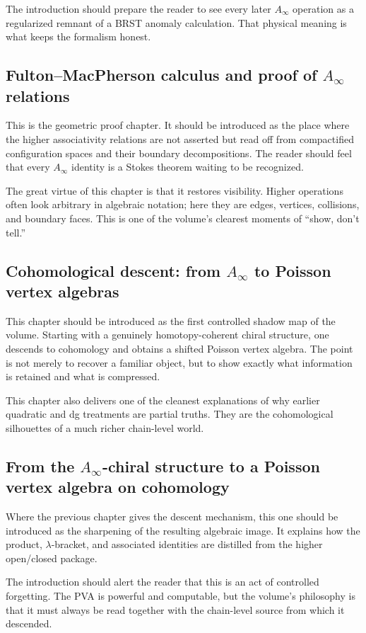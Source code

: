 The introduction should prepare the reader to see every later $A_\infty$ operation as a regularized remnant of a BRST anomaly calculation.  That physical meaning is what keeps the formalism honest.

\subsection*{Fulton--MacPherson calculus and proof of $A_\infty$ relations}
This is the geometric proof chapter.  It should be introduced as the place where the higher associativity relations are not asserted but read off from compactified configuration spaces and their boundary decompositions.  The reader should feel that every $A_\infty$ identity is a Stokes theorem waiting to be recognized.

The great virtue of this chapter is that it restores visibility.  Higher operations often look arbitrary in algebraic notation; here they are edges, vertices, collisions, and boundary faces.  This is one of the volume's clearest moments of ``show, don't tell.''

\subsection*{Cohomological descent: from $A_\infty$ to Poisson vertex algebras}
This chapter should be introduced as the first controlled shadow map of the volume.  Starting with a genuinely homotopy-coherent chiral structure, one descends to cohomology and obtains a shifted Poisson vertex algebra.  The point is not merely to recover a familiar object, but to show exactly what information is retained and what is compressed.

This chapter also delivers one of the cleanest explanations of why earlier quadratic and dg treatments are partial truths.  They are the cohomological silhouettes of a much richer chain-level world.

\subsection*{From the $A_\infty$-chiral structure to a Poisson vertex algebra on cohomology}
Where the previous chapter gives the descent mechanism, this one should be introduced as the sharpening of the resulting algebraic image.  It explains how the product, $\lambda$-bracket, and associated identities are distilled from the higher open/closed package.

The introduction should alert the reader that this is an act of controlled forgetting.  The PVA is powerful and computable, but the volume's philosophy is that it must always be read together with the chain-level source from which it descended.

